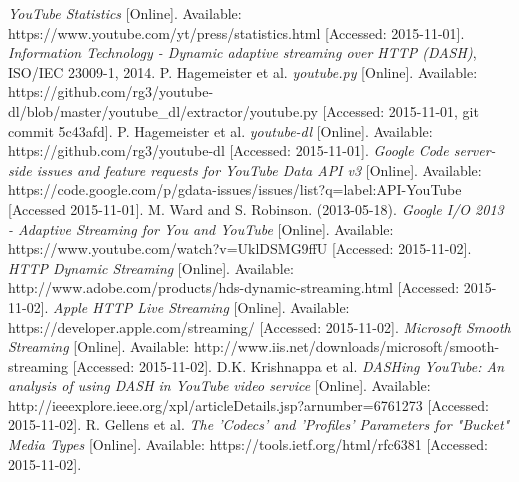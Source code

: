 \begin{thebibliography}{5}
    \footnotesize
        \textit{YouTube Statistics}
        [Online].
        Available:
        https://www.youtube.com/yt/press/statistics.html
        [Accessed: 2015-11-01].
        \textit{Information Technology - Dynamic adaptive streaming over HTTP (DASH)},
        ISO/IEC 23009-1, 2014.
        P. Hagemeister et al.
        \textit{youtube.py}
        [Online].
        Available:
        https://github.com/rg3/youtube-dl/blob/master/youtube\_dl/extractor/youtube.py
        [Accessed: 2015-11-01, git commit 5c43afd].
        P. Hagemeister et al.
        \textit{youtube-dl}
        [Online].
        Available:
        https://github.com/rg3/youtube-dl
        [Accessed: 2015-11-01].
        \textit{Google Code server-side issues and feature requests for YouTube Data API v3}
        [Online].
        Available:
        https://code.google.com/p/gdata-issues/issues/list?q=label:API-YouTube
        [Accessed 2015-11-01].
        M. Ward and S. Robinson.
        (2013-05-18).
        \textit{Google I/O 2013 - Adaptive Streaming for You and YouTube}
        [Online].
        Available:
        https://www.youtube.com/watch?v=UklDSMG9ffU
        [Accessed: 2015-11-02].
        \textit{HTTP Dynamic Streaming}
        [Online].
        Available:
        http://www.adobe.com/products/hds-dynamic-streaming.html
        [Accessed: 2015-11-02].
        \textit{Apple HTTP Live Streaming}
        [Online].
        Available:
        https://developer.apple.com/streaming/
        [Accessed: 2015-11-02].
        \textit{Microsoft Smooth Streaming}
        [Online].
        Available:
        http://www.iis.net/downloads/microsoft/smooth-streaming
        [Accessed: 2015-11-02].
        D.K. Krishnappa et al.
        \textit{DASHing YouTube: An analysis of using DASH in YouTube video service}
        [Online].
        Available:
        http://ieeexplore.ieee.org/xpl/articleDetails.jsp?arnumber=6761273
        [Accessed: 2015-11-02].
        R. Gellens et al.
        \textit{The 'Codecs' and 'Profiles' Parameters for "Bucket" Media Types}
        [Online].
        Available:
        https://tools.ietf.org/html/rfc6381
        [Accessed: 2015-11-02].

\end{thebibliography}
